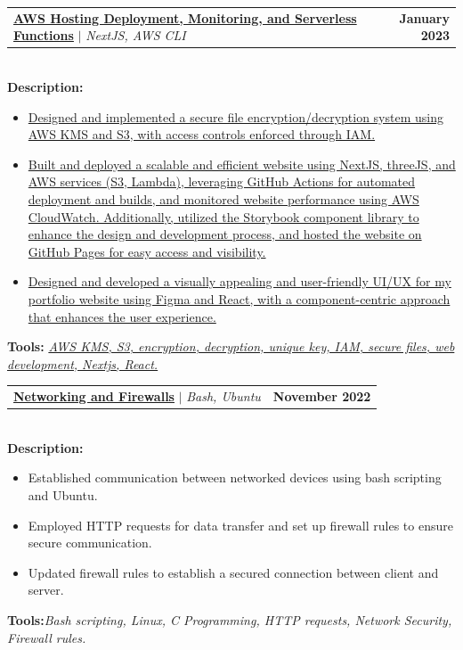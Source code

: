 \documentclass[letterpaper,11pt]{article}
\makeatletter
\newcommand{\resumeItem}[1]{
  \item\small{
    {#1 \vspace{-2pt}}
  }
}
\newcommand{\resumeProjectHeading}[2]{
    \item
    \begin{tabular*}{1.001\textwidth}{l@{\extracolsep{\fill}}r}
      \small#1 & \textbf{\small #2}\\
    \end{tabular*}\vspace{-7pt}
}
\newcommand{\resumeItemListStart}{\begin{itemize}}
\newcommand{\resumeItemListEnd}{\end{itemize}\vspace{-5pt}}
\makeatother
\begin{document}
          \resumeProjectHeading
          {\href{https://yakkshit.com}{\textbf{AWS Hosting Deployment, Monitoring, and Serverless Functions}} $|$ \emph{NextJS, AWS CLI}}{January 2023}\\
          \vspace{6pt}
          \textbf{Description:} 
          \vspace{-5pt}
          \resumeItemListStart
            \resumeItem{\href{https://yakkshit.com}{Designed and implemented a secure file encryption/decryption system using AWS KMS and S3, with access controls enforced through IAM.}}
            \resumeItem{\href{https://yakkshit.com}{Built and deployed a scalable and efficient website using NextJS, threeJS, and AWS services (S3, Lambda), leveraging GitHub Actions for automated deployment and builds, and monitored website performance using AWS CloudWatch. Additionally, utilized the Storybook component library to enhance the design and development process, and hosted the website on GitHub Pages for easy access and visibility.}}
            \resumeItem{\href{https://yakkshit.com}{Designed and developed a visually appealing and user-friendly UI/UX for my portfolio website using Figma and React, with a component-centric approach that enhances the user experience.}}
          \resumeItemListEnd
          \vspace{-2pt}
          \textbf{Tools:}\emph{ \href{https://yakkshit.com}{AWS KMS, S3, encryption, decryption, unique key, IAM, secure files, web development, Nextjs, React.}}
          \vspace{-22pt}
          \resumeProjectHeading
          {\textbf{\href{https://github.com/saiyakkshit?tab=repositories}{Networking and Firewalls}} $|$ \emph{Bash, Ubuntu}}{November 2022}\\
          \vspace{6pt}
          \textbf{Description:}
           \vspace{-5pt}
          \resumeItemListStart
            \resumeItem{Established communication between networked devices using bash scripting and Ubuntu.}
            \resumeItem{Employed HTTP requests for data transfer and set up firewall rules to ensure secure communication.}
            \resumeItem{Updated firewall rules to establish a secured connection between client and server.}           
          \resumeItemListEnd 
          \textbf{Tools:}\emph{Bash scripting,
Linux,
C Programming,
HTTP requests, Network Security,
Firewall rules.}
          \vspace{-15pt}
\end{document}
